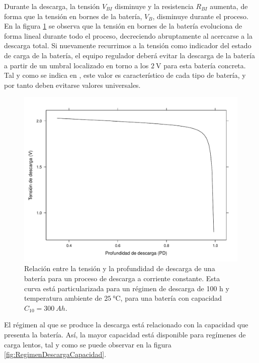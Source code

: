 Durante la descarga, la tensión $V_{BI}$ disminuye y la resistencia
$R_{BI}$ aumenta, de forma que la tensión en bornes de la batería,
$V_{B}$, disminuye durante el proceso. En la figura \ref{fig:CurvaDescarga}
se observa que la tensión en bornes de la batería evoluciona de forma
lineal durante todo el proceso, decreciendo abruptamente al acercarse
a la descarga total. Si nuevamente recurrimos a la tensión como indicador
del estado de carga de la batería, el equipo regulador deberá evitar
la descarga de la batería a partir de un umbral localizado en torno
a los $\SI{2}{\volt}$ para esta batería concreta. Tal y como se indica
en \citep{Egido.Lorenzo1998}, este valor es característico de cada
tipo de batería, y por tanto deben evitarse valores universales.

%
\begin{figure}
\includegraphics[scale=0.6]{../figs/Bateria_SOCyDescarga}

\caption[Relación entre la tensión y la profundidad de descarga de una batería
para un proceso de descarga a corriente constante]{\label{fig:CurvaDescarga}Relación entre la tensión y la profundidad
de descarga de una batería para un proceso de descarga a corriente
constante. Esta curva está particularizada para un régimen de descarga
de 100 h y temperatura ambiente de $\SI{25}{\celsius}$, para una
batería con capacidad $C_{10}=\SI{300}{Ah}$.}



\end{figure}


El régimen al que se produce la descarga está relacionado con la capacidad
que presenta la batería. Así, la mayor capacidad está disponible para
regímenes de carga lentos, tal y como se puede observar en la figura
\ref{fig:RegimenDescargaCapacidad}.

